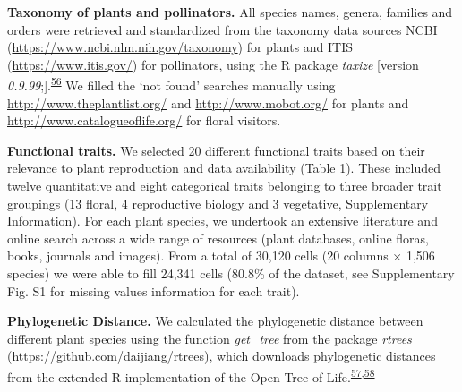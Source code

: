 \documentclass[
  12pt,
  a4paper,
]{article}
\begin{document}
\textbf{Taxonomy of plants and pollinators.} All species names, genera, families and orders were retrieved and standardized from the taxonomy data sources NCBI (\url{https://www.ncbi.nlm.nih.gov/taxonomy}) for plants and ITIS (\url{https://www.itis.gov/}) for pollinators, using the R package \emph{taxize} {[}version \emph{0.9.99};{]}.\textsuperscript{\protect\hyperlink{ref-chamberlain2020}{56}} We filled the `not found' searches manually using \url{http://www.theplantlist.org/} and \url{http://www.mobot.org/} for plants and \url{http://www.catalogueoflife.org/} for floral visitors.

\textbf{Functional traits.} We selected 20 different functional traits based on their relevance to plant reproduction and data availability (Table 1). These included twelve quantitative and eight categorical traits belonging to three broader trait groupings (13 floral, 4 reproductive biology and 3 vegetative, Supplementary Information). For each plant species, we undertook an extensive literature and online search across a wide range of resources (plant databases, online floras, books, journals and images). From a total of 30,120 cells (20 columns × 1,506 species) we were able to fill 24,341 cells (80.8\% of the dataset, see Supplementary Fig. S1 for missing values information for each trait).

\textbf{Phylogenetic Distance.} We calculated the phylogenetic distance between different plant species using the function \emph{get\_tree} from the package \emph{rtrees} (\url{https://github.com/daijiang/rtrees}), which downloads phylogenetic distances from the extended R implementation of the Open Tree of Life.\textsuperscript{\protect\hyperlink{ref-smith2018}{57},\protect\hyperlink{ref-jin2019}{58}}

\singlespacing
\end{document}
